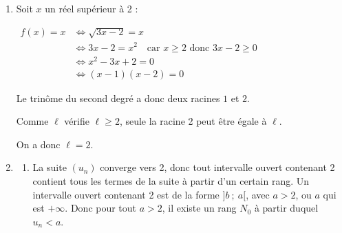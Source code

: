 \begin{enumerate}
\begin{enumerate}
			Enfin, comme $4 \leqslant 6$, ce qui précède implique :\quad $2 \leqslant u_{n+2} \leqslant u_{n+1}\leqslant 6$.

			Si l'inégalité est vraie pour un entier naturel $n$ donné, alors on prouve qu'elle est aussi vraie pour l'indice suivant, $n+1$.

			\emph{Conclusion :} L'inégalité est vraie pour l'indice $n=0$, et pour tout $n$ entier naturel, elle est héréditaire. Par application du principe de récurrence, on peut affirmer que, pour tout $n$ entier naturel, on a :\quad $2 \leqslant u_{n+1} \leqslant u_{n}\leqslant 6$.

			\item De la question précédente on tire :
			\begin{itemize}
				\item $\forall n \in \N,\quad u_{n+1} \leqslant u_n$:\quad la suite $(u_n)$ est décroissante;
				\item $\forall n \in \N,\quad 2 \leqslant u_n$:\quad la suite $(u_n)$ est minorée par 2;
			\end{itemize}
			$(u_n)$ est décroissante et minorée par 2, donc elle converge vers une limite $\ell$ qui vérifie :\quad $2 \leqslant \ell$.
		\end{enumerate}

		\item Soit $x$ un réel supérieur à 2 :

		$\begin{aligned}
			f(x) = x &\iff \sqrt{3x-2} = x \\
			&\iff 3x - 2 = x^2\quad \text{car $x \geqslant 2$ donc } 3x - 2 \geqslant 0\\
			&\iff x^2 - 3x + 2 = 0\\
			&\iff (x-1)(x-2) = 0
		\end{aligned}$

		Le trinôme du second degré a donc deux racines $1$ et $2$.

		Comme $\ell$ vérifie $\ell \geqslant 2$, seule la racine 2 peut être égale à $\ell$.

		On a donc $\ell = 2$.

		\item
		\begin{enumerate}
			\item La suite $(u_n)$ converge vers 2, donc tout intervalle ouvert contenant 2 contient tous les termes de la suite à partir d'un certain rang. Un intervalle ouvert contenant 2 est de la forme $]b ~;~ a[$, avec $a > 2$, ou $a$ qui est $+\infty$. Donc pour tout $a > 2$, il existe un rang $N_0$ à partir duquel $u_n < a$.


\end{enumerate}
\end{enumerate}
